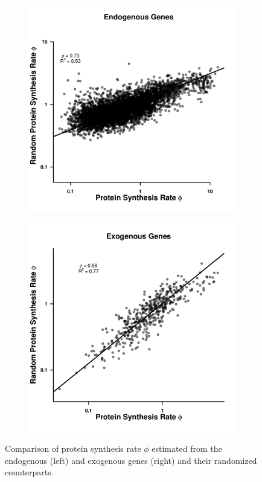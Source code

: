 \documentclass[doublespacing,linenumbers]{bmcart-modified}
\begin{document}
\begin{backmatter}
\begin{figure}
    \centering
    \begin{subfigure}
        \centering
        \includegraphics[width=.45\textwidth]{img/figS13a.pdf}
    \end{subfigure}
    \begin{subfigure}
        \centering
        \includegraphics[width=.45\textwidth]{img/figS13b.pdf}
    \end{subfigure}
    \caption{Comparison of protein synthesis rate $\phi$ estimated from the endogenous (left) and exogenous genes (right) and their randomized counterparts. }
    \label{fig:rnd_phi}
\end{figure}
\null
\vfill

\end{backmatter}
\end{document}
